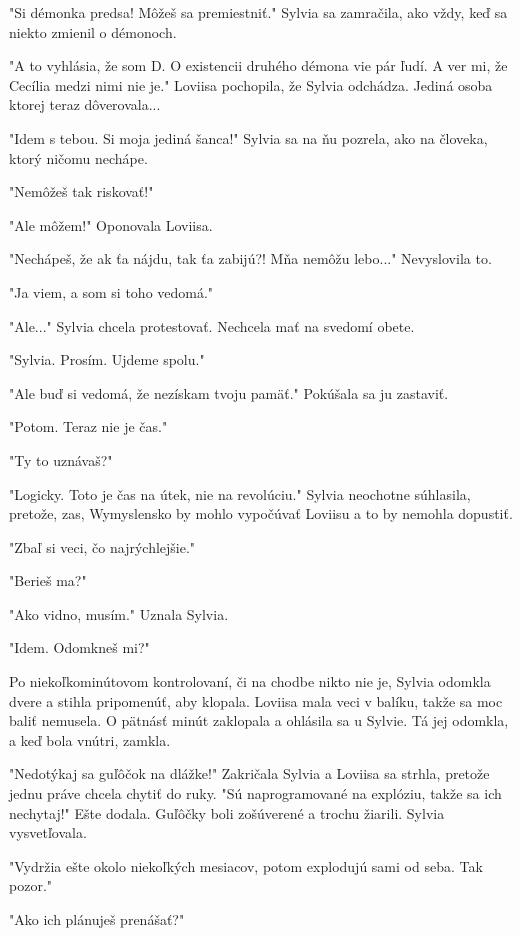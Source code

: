 \documentclass{book}
\begin{document}
"$ $Si démonka predsa! Môžeš sa premiestniť."$ $  Sylvia sa zamračila, ako vždy, keď sa niekto zmienil o démonoch.

"$ $A to vyhlásia, že som D. O existencii druhého démona vie pár ľudí. A ver mi, že Cecília medzi nimi nie je."$ $  Loviisa pochopila, že Sylvia odchádza. Jediná osoba ktorej teraz dôverovala...

"$ $Idem s tebou. Si moja jediná šanca!"$ $  Sylvia sa na ňu pozrela, ako na človeka, ktorý ničomu nechápe.

"$ $Nemôžeš tak riskovať!"$ $ 

"$ $Ale môžem!"$ $  Oponovala Loviisa.

"$ $Nechápeš, že ak ťa nájdu, tak ťa zabijú?! Mňa nemôžu lebo..."$ $  Nevyslovila to.

"$ $Ja viem, a som si toho vedomá."$ $ 

"$ $Ale..."$ $  Sylvia chcela protestovať. Nechcela mať na svedomí obete.

"$ $Sylvia. Prosím. Ujdeme spolu."$ $ 

"$ $Ale buď si vedomá, že nezískam tvoju pamäť."$ $  Pokúšala sa ju zastaviť.

"$ $Potom. Teraz nie je čas."$ $ 

"$ $Ty to uznávaš?"$ $ 

"$ $Logicky. Toto je čas na útek, nie na revolúciu."$ $  Sylvia neochotne súhlasila, pretože, zas, Wymyslensko by mohlo vypočúvať Loviisu a to by nemohla dopustiť.

"$ $Zbaľ si veci, čo najrýchlejšie."$ $ 

"$ $Berieš ma?"$ $ 

"$ $Ako vidno, musím."$ $  Uznala Sylvia.

"$ $Idem. Odomkneš mi?"$ $ 

Po niekoľkominútovom kontrolovaní, či na chodbe nikto nie je, Sylvia odomkla dvere a stihla pripomenúť, aby klopala. Loviisa mala veci v balíku, takže sa moc baliť nemusela. O pätnásť minút zaklopala a ohlásila sa u Sylvie. Tá jej odomkla, a keď bola vnútri, zamkla.

"$ $Nedotýkaj sa guľôčok na dlážke!"$ $  Zakričala Sylvia a Loviisa sa strhla, pretože jednu práve chcela chytiť do ruky. "$ $Sú naprogramované na explóziu, takže sa ich nechytaj!"$ $  Ešte dodala. Guľôčky boli zošúverené a trochu žiarili. Sylvia vysvetľovala.

"$ $Vydržia ešte okolo niekoľkých mesiacov, potom explodujú sami od seba. Tak pozor."$ $ 

"$ $Ako ich plánuješ prenášať?"$ $ 
\end{document}
